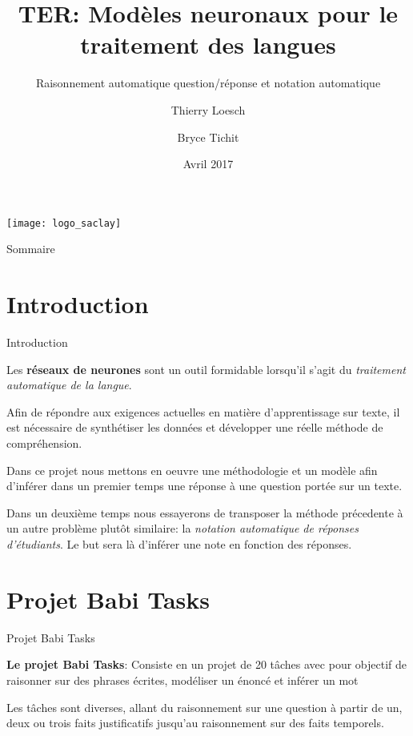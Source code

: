 \documentclass{beamer}
\title{TER: Modèles neuronaux pour le traitement des langues}
\subtitle{Raisonnement automatique question/réponse et notation automatique}
\author{Thierry Loesch \and Bryce Tichit}
\institute
{
	M1 Informatique\\
	Université Paris-Sud
}
\date{Avril 2017}
\theoremstyle{definition}
\begin{document}
	
	\begin{frame}
		\titlepage
		\centering\texttt{[image: logo\_saclay]}
	\end{frame}
	
	\begin{frame}{Sommaire}
		\tableofcontents
	\end{frame}


\section{Introduction}

\begin{frame}{Introduction}{}
	
Les \textbf{réseaux de neurones} sont un outil formidable lorsqu'il s'agit du \textit{traitement automatique de la langue}.\pause

\vspace{0.5cm}

Afin de répondre aux exigences actuelles en matière d'apprentissage sur texte, il est nécessaire de synthétiser les données et développer une réelle méthode de compréhension.\pause

\vspace{0.5cm}

Dans ce projet nous mettons en oeuvre une méthodologie et un modèle afin d'inférer dans un premier temps une réponse à une question portée sur un texte.\pause

\vspace{0.5cm}

Dans un deuxième temps nous essayerons de transposer la méthode précedente à un autre problème plutôt similaire: la \textit{notation automatique de réponses d'étudiants}. Le but sera là d'inférer une note en fonction des réponses.
		
\end{frame}


\section{Projet Babi Tasks}

\begin{frame}{Projet Babi Tasks}

\textbf{Le projet Babi Tasks}: Consiste en un projet de 20 tâches avec pour objectif de raisonner sur des phrases écrites, modéliser un énoncé et inférer un mot

\pause
\vspace{0.5cm}


Les tâches sont diverses, allant du raisonnement sur une question à partir de un, deux ou trois faits justificatifs jusqu'au raisonnement sur des faits temporels.
    
\end{frame}
\end{document}
